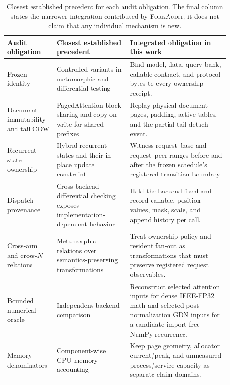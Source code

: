 \documentclass{article}
\newcommand{\method}{\textsc{ForkAudit}}
\begin{document}
\begin{table}[H]
\caption{Closest established precedent for each audit obligation.  The final
column states the narrower integration contributed by \method{}; it does not
claim that any individual mechanism is new.}
\centering\scriptsize
\begin{tabular}{@{}p{0.18\linewidth}p{0.31\linewidth}p{0.42\linewidth}@{}}
\toprule
Audit obligation & Closest established precedent & Integrated obligation in this work \\
\midrule
Frozen identity & Controlled variants in metamorphic and differential testing~\citep{chen2018metamorphic,xiao2022metamorphic,pham2019cradle} & Bind model, data, query bank, callable contract, and protocol bytes to every ownership receipt. \\
Document immutability and tail COW & PagedAttention block sharing and copy-on-write for shared prefixes~\citep{kwon2023pagedattention} & Replay physical document pages, padding, active tables, and the partial-tail detach event. \\
Recurrent-state ownership & Hybrid recurrent states and their in-place update constraint~\citep{yang2025gateddeltanet,pan2025marconi} & Witness request--base and request--peer ranges before and after the frozen schedule's registered transition boundary. \\
Dispatch provenance & Cross-backend differential checking exposes implementation-dependent behavior~\citep{pham2019cradle} & Hold the backend fixed and record callable, position values, mask, scale, and append history per call. \\
Cross-arm and cross-$N$ relations & Metamorphic relations over semantics-preserving transformations~\citep{chen2018metamorphic,xiao2022metamorphic} & Treat ownership policy and resident fan-out as transformations that must preserve registered request observables. \\
Bounded numerical oracle & Independent backend comparison~\citep{pham2019cradle} & Reconstruct selected attention inputs for dense IEEE-FP32 math and selected post-normalization GDN inputs for a candidate-import-free NumPy recurrence. \\
Memory denominators & Component-wise GPU-memory accounting~\citep{gao2020dnnmem} & Keep page geometry, allocator current/peak, and unmeasured process/service capacity as separate claim domains. \\
\bottomrule
\end{tabular}
\end{table}
\end{document}
